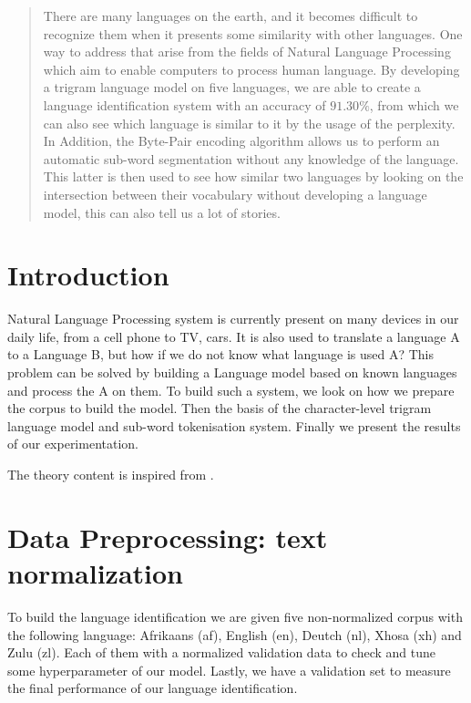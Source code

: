 \begin{abstract}
There are many languages on the earth, and it becomes difficult to recognize them when it presents some similarity with other languages. One way to address that arise from the fields of Natural Language Processing which aim to enable computers to process human language. By developing a trigram language model on five languages, we are able to create a language identification system with an accuracy of $91.30\%$, from which we can also see which language is similar to it by the usage of the perplexity. In Addition, the Byte-Pair encoding algorithm allows us to perform an automatic sub-word segmentation without any knowledge of the language. This latter is then used to see how similar two languages by looking on the intersection between their vocabulary without developing a language model, this can also tell us a lot of stories.

\end{abstract}
\section{Introduction}
Natural Language Processing system is currently present on many devices in our daily life, from a cell phone to TV, cars. It is also used to translate a language A to a Language B, but how if we do not know what language is used A? This problem can be solved by building a Language model based on known languages and process the A on them. To build such a system, we look on how we prepare the corpus to build the model. Then the basis of the character-level trigram language model and sub-word tokenisation system. Finally we present the results of our experimentation.

\medskip
The theory content is inspired from \cite{kamper2022nlp817, jurafsky2022speech}.
\section{Data Preprocessing: text normalization}
To build the language identification we are given five non-normalized corpus with the following language: Afrikaans (af), English (en), Deutch (nl), Xhosa (xh) and Zulu (zl).
Each of them with a normalized validation data to check and tune some hyperparameter of our model. Lastly, we have a validation set to measure the final performance of our language identification.

